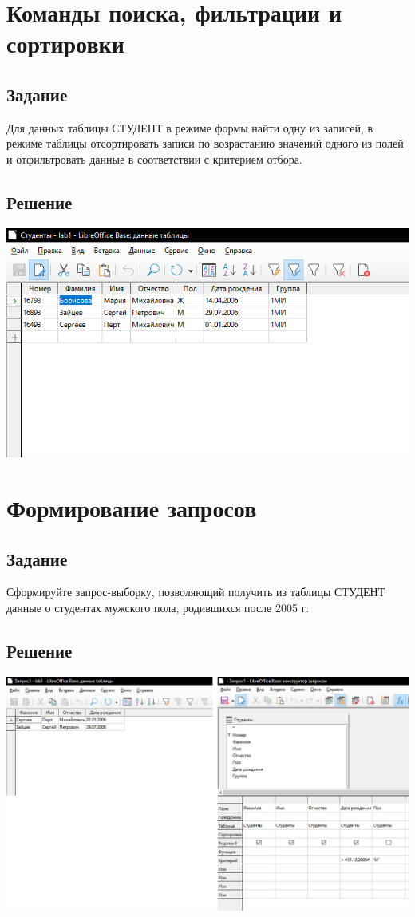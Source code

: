 \documentclass[a4paper, 12pt]{article}
\begin{document}
\section{Команды поиска, фильтрации и сортировки}
\subsection{Задание}
Для  данных  таблицы  СТУДЕНТ  в  режиме  формы  найти  одну  из 
записей,  в  режиме  таблицы  отсортировать  записи  по  возрастанию 
значений одного из полей и отфильтровать данные в соответствии с 
критерием отбора.
\subsection{Решение}
\includegraphics[width=\textwidth]{"5-1.png"}\\

\section{Формирование запросов}
\subsection{Задание}
Сформируйте запрос-выборку, позволяющий получить из таблицы 
СТУДЕНТ данные о студентах мужского пола, родившихся после 2005 г. 
\subsection{Решение}
\includegraphics[width=\textwidth]{"6-1.png"}\\
\end{document}

